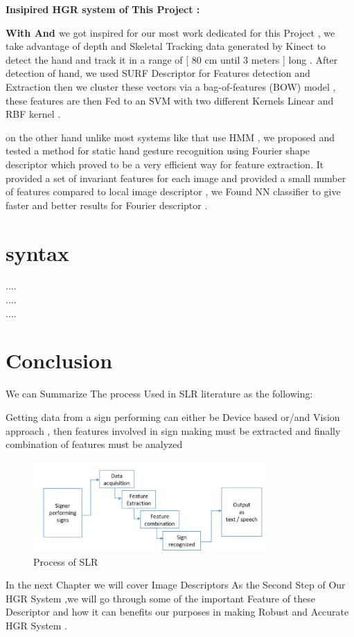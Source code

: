 \textbf{ Insipired HGR system  of This Project : }


\textbf{With \cite{dardas} And \cite{47} } we got inspired for our most work dedicated for this Project , we take advantage of  depth and Skeletal Tracking  data generated by Kinect to detect the hand and track it  in a range of [ 80 cm until 3 meters ] long  .
After detection of hand, we used SURF Descriptor for Features detection and Extraction then we  cluster these vectors via a bag-of-features (BOW) model , these features are then Fed to an SVM with two different Kernels Linear and RBF kernel .

on the other hand unlike most systems like \cite{33} that use HMM ,  we proposed and tested a method for static hand gesture recognition using  Fourier shape  descriptor which proved to be a very efficient way for feature extraction. It provided a set of invariant features for each image and provided a small number of features compared to local image descriptor  , we Found NN classifier to give faster and better results for Fourier descriptor .


\section{syntax}

....
\\
....
\\
....


\newpage
\section{Conclusion}

We can Summarize The process Used in SLR literature as the following:

Getting data from a sign performing can either be Device based or/and Vision approach , then features
involved in sign making must be extracted and finally combination of features must be analyzed 

\begin{figure}[H]
\centering
\includegraphics[width=0.8\textwidth]{img/SLR.PNG}
\caption{  Process of SLR }
\label{fig:SLR}
\end{figure}

In the next Chapter we will cover Image Descriptors As the Second Step of Our HGR System ,we will go through some of the important Feature of these Descriptor and how it can benefits our purposes in making Robust and Accurate HGR System . 